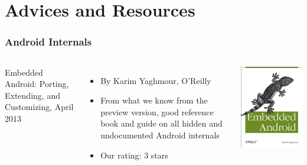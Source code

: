 \section{Advices and Resources}

\begin{frame}
  \frametitle{Android Internals}
  \begin{columns}
    Embedded Android: Porting, Extending, and Customizing, April 2013
    \begin{itemize}
    \item By Karim Yaghmour, O'Reilly
    \item From what we know from the preview version, good reference book and guide
      on all hidden and undocumented Android internals
    \item Our rating: 3 stars
    \end{itemize}
    \includegraphics[width=\textwidth]{slides/android-resources/embedded-android.jpg}
  \end{columns}
\end{frame}

